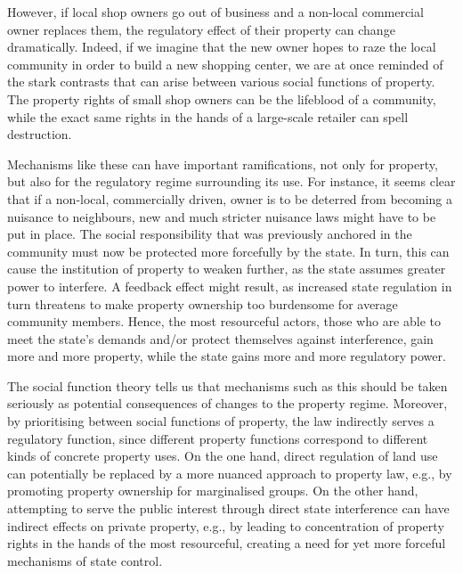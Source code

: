 However, if local shop owners go out of business and a non-local commercial owner replaces them, the  regulatory effect of their property can change dramatically. %
Indeed, if we imagine that the new owner hopes to raze the local community in order to build a new shopping center, we are at once reminded of the stark contrasts that can arise between various social functions of property. The property rights of small shop owners can be the lifeblood of a community, while the exact same rights in the hands of a large-scale retailer can spell destruction.


Mechanisms like these can have important ramifications, not only for property, but also for the regulatory regime surrounding its use. For instance, it seems clear that if a non-local, commercially driven, owner is to be deterred from becoming a nuisance to neighbours, new and much stricter nuisance laws might have to be put in place. The social responsibility that was previously anchored in the community must now be protected more forcefully by the state. In turn, this can cause the institution of property to weaken further, as the state assumes greater power to interfere. A feedback effect might result, as increased state regulation in turn threatens to make property ownership too burdensome for average community members. Hence, the most resourceful actors, those who are able to meet the state's demands and/or protect themselves against interference, gain more and more property, while the state gains more and more regulatory power.

The social function theory tells us that mechanisms such as this should be taken seriously as potential consequences of changes to the property regime. Moreover, by prioritising between social functions of property, the law indirectly serves a regulatory function, since different property functions correspond to different kinds of concrete property uses. On the one hand, direct regulation of land use can potentially be replaced by a more nuanced approach to property law, e.g., by promoting property ownership for marginalised groups. On the other hand, attempting to serve the public interest through direct state interference can have indirect effects on private property, e.g., by leading to concentration of property rights in the hands of the most resourceful, creating a need for yet more forceful mechanisms of state control.

